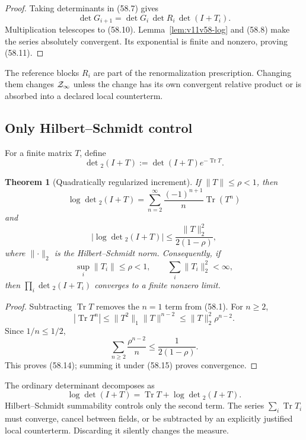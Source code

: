 \documentclass[11pt]{article}
\newtheorem{theorem}{Theorem}[section]
\begin{document}
\begin{proof}
Taking determinants in (58.7) gives
\[
 \det G_{i+1}
 =\det G_i\,\det R_i\,\det(I+T_i).
\]
Multiplication telescopes to (58.10).  Lemma~\ref{lem:v11v58-log} and
(58.8) make the series absolutely convergent.  Its exponential is
finite and nonzero, proving (58.11).
\end{proof}

The reference blocks \(R_i\) are part of the renormalization
prescription.  Changing them changes \({\cal Z}_\infty\) unless the
change has its own convergent relative product or is absorbed into a
declared local counterterm.

\subsection{Only Hilbert--Schmidt control}

For a finite matrix \(T\), define
\[
                  \det{}_2(I+T):=\det(I+T)e^{-\operatorname{Tr}T}.
                                                                  \tag{58.12}
\]

\begin{theorem}[Quadratically regularized increment]
\label{thm:v11v58-det2}
If \(\lVert T\rVert\le\rho<1\), then
\[
 \log\det{}_2(I+T)
 =\sum_{n=2}^{\infty}\frac{(-1)^{n+1}}n\operatorname{Tr}(T^n)
                                                                  \tag{58.13}
\]
and
\[
 \left|\log\det{}_2(I+T)\right|
 \le\frac{\lVert T\rVert_2^2}{2(1-\rho)},                     \tag{58.14}
\]
where \(\lVert\cdot\rVert_2\) is the Hilbert--Schmidt norm.
Consequently, if
\[
              \sup_i\lVert T_i\rVert\le\rho<1,\qquad
              \sum_i\lVert T_i\rVert_2^2<\infty,              \tag{58.15}
\]
then \(\prod_i\det{}_2(I+T_i)\) converges to a finite nonzero limit.
\end{theorem}

\begin{proof}
Subtracting \(\operatorname{Tr}T\) removes the \(n=1\) term from
(58.1).  For \(n\ge2\),
\[
 |\operatorname{Tr}T^n|
 \le\lVert T^2\rVert_1\lVert T\rVert^{n-2}
 \le\lVert T\rVert_2^2\rho^{n-2}.
\]
Since \(1/n\le1/2\),
\[
 \sum_{n\ge2}\frac{\rho^{n-2}}n
 \le\frac1{2(1-\rho)}.
\]
This proves (58.14); summing it under (58.15) proves convergence.
\end{proof}

\begin{warning}
\label{warn:v11v58-linear}
The ordinary determinant decomposes as
\[
                 \log\det(I+T)
                  =\operatorname{Tr}T+\log\det{}_2(I+T).      \tag{58.16}
\]
Hilbert--Schmidt summability controls only the second term.  The series
\(\sum_i\operatorname{Tr}T_i\) must converge, cancel between fields,
or be subtracted by an explicitly justified local counterterm.
Discarding it silently changes the measure.
\end{warning}
\end{document}
